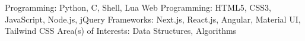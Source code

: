 \begin{cvhonors}
  \cvhonor
    {Programming:}
    {Python, C, Shell, Lua}
    {}
    {}
  \cvhonor
    {Web Programming:}
    {HTML5, CSS3, JavaScript, Node.js, jQuery}
    {}
    {}
  \cvhonor
    {Frameworks:}
    {Next.js, React.js, Angular, Material UI, Tailwind CSS}
    {}
    {}
  \cvhonor
    {Area(s) of Interests:}
    {Data Structures, Algorithms}
    {}
    {}
\end{cvhonors}


